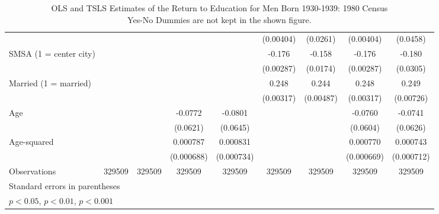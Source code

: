 \documentclass{article}
\begin{document}
\begin{landscape}
\begin{table}[htbp]
\begin{tabular}{l*{8}{c}}
                         &                     &                     &                     &                     &   (0.00404)         &    (0.0261)         &   (0.00404)         &    (0.0458)         \\
[1em]
SMSA (1 = center city)   &                     &                     &                     &                     &      -0.176\sym{***}&      -0.158\sym{***}&      -0.176\sym{***}&      -0.180\sym{***}\\
                         &                     &                     &                     &                     &   (0.00287)         &    (0.0174)         &   (0.00287)         &    (0.0305)         \\
[1em]
Married (1 = married)    &                     &                     &                     &                     &       0.248\sym{***}&       0.244\sym{***}&       0.248\sym{***}&       0.249\sym{***}\\
                         &                     &                     &                     &                     &   (0.00317)         &   (0.00487)         &   (0.00317)         &   (0.00726)         \\
[1em]
Age                      &                     &                     &     -0.0772         &     -0.0801         &                     &                     &     -0.0760         &     -0.0741         \\
                         &                     &                     &    (0.0621)         &    (0.0645)         &                     &                     &    (0.0604)         &    (0.0626)         \\
[1em]
Age-squared              &                     &                     &    0.000787         &    0.000831         &                     &                     &    0.000770         &    0.000743         \\
                         &                     &                     &  (0.000688)         &  (0.000734)         &                     &                     &  (0.000669)         &  (0.000712)         \\
\hline
Observations             &      329509         &      329509         &      329509         &      329509         &      329509         &      329509         &      329509         &      329509         \\
\hline\hline
\multicolumn{9}{l}{\footnotesize Standard errors in parentheses}\\
\multicolumn{9}{l}{\footnotesize \sym{*} \(p<0.05\), \sym{**} \(p<0.01\), \sym{***} \(p<0.001\)}\\
\end{tabular}
\caption[caption]{OLS and TSLS Estimates of the Return to Education for Men Born 1930-1939: 1980 Census \\\hspace{\textwidth}  Yes-No Dummies are not kept in the shown figure.}
\end{table}
\end{landscape}
\end{document}
